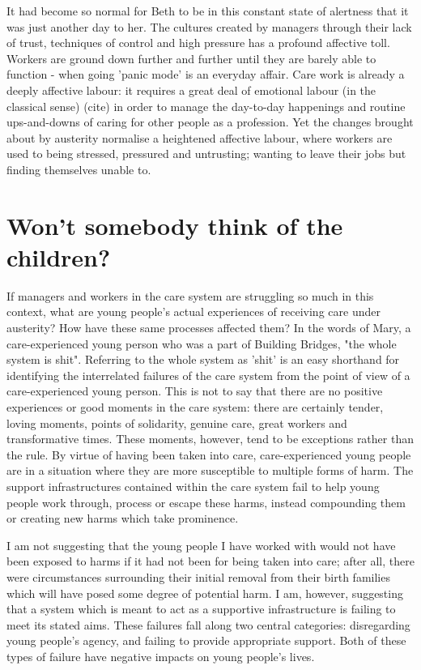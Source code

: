 It had become so normal for Beth to be in this constant state of alertness that it was just another day to her. The cultures created by managers through their lack of trust, techniques of control and high pressure has a profound affective toll. Workers are ground down further and further until they are barely able to function - when going 'panic mode' is an everyday affair. Care work is already a deeply affective labour: it requires a great deal of emotional labour (in the classical sense) (cite) in order to manage the day-to-day happenings and routine ups-and-downs of caring for other people as a profession. Yet the changes brought about by austerity normalise a heightened affective labour, where workers are used to being stressed, pressured and untrusting; wanting to leave their jobs but finding themselves unable to.

\section{Won't somebody think of the children?}
If managers and workers in the care system are struggling so much in this context, what are young people's actual experiences of receiving care under austerity? How have these same processes affected them? In the words of Mary, a care-experienced young person who was a part of Building Bridges, "the whole system is shit". Referring to the whole system as 'shit' is an easy shorthand for identifying the interrelated failures of the care system from the point of view of a care-experienced young person. This is not to say that there are no positive experiences or good moments in the care system: there are certainly tender, loving moments, points of solidarity, genuine care, great workers and transformative times. These moments, however, tend to be exceptions rather than the rule. By virtue of having been taken into care, care-experienced young people are in a situation where they are more susceptible to multiple forms of harm. The support infrastructures contained within the care system fail to help young people work through, process or escape these harms, instead compounding them or creating new harms which take prominence.

I am not suggesting that the young people I have worked with would not have been exposed to harms if it had not been for being taken into care; after all, there were circumstances surrounding their initial removal from their birth families which will have posed some degree of potential harm. I am, however, suggesting that a system which is meant to act as a supportive infrastructure is failing to meet its stated aims. These failures fall along two central categories: disregarding young people's agency, and failing to provide appropriate support. Both of these types of failure have negative impacts on young people's lives.

